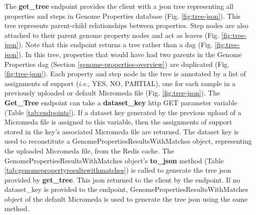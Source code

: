 The \textbf{get\_tree} endpoint provides the client with a \gls{json} tree 
representing all properties and steps in Genome Properties database (Fig. 
\ref{fig:tree-json}). This tree represents parent-child relationships between 
properties. Step nodes are also attached to their parent genome property nodes 
and act as leaves (Fig. \ref{fig:tree-json}). Note that this endpoint returns a 
tree rather than a \gls{dag} (Fig. \ref{fig:tree-json}). In this tree, 
properties that would have had two parents in the Genome Properties \gls{dag} 
(Section \ref{genome-properties-overview}) are duplicated (Fig. 
\ref{fig:tree-json}). Each property and step node in the tree is annotated by a 
list of assignments of support (\textit{i}.\textit{e}., YES, NO, PARTIAL), one 
for each sample in a previously uploaded or default Micromeda file (Fig. 
\ref{fig:tree-json}). The \textbf{Get\_Tree} endpoint can take a 
\textbf{dataset\_key} \gls{http} GET parameter variable (Table 
\ref{tab:endpoints}). If a dataset key generated by the previous upload of a 
Micromeda file is assigned to this variable, then the assignments of support 
stored in the key's associated Micromeda file are returned. The dataset key is 
used to reconstitute a GenomePropertiesResultsWithMatches object, representing 
the uploaded Micromeda file, from the Redis cache. The 
GenomePropertiesResultsWithMatches object's \textbf{to\_json} method (Table 
\ref{tab:genomepropertyresultswithmatches}) is called to generate the tree 
\gls{json} provided by \textbf{get\_tree}. This \gls{json} returned to the 
client by the endpoint. If no dataset\_key is provided to the endpoint, 
GenomePropertiesResultsWithMatches object of the default Micromeda is used to 
generate the tree \gls{json} using the same method.

